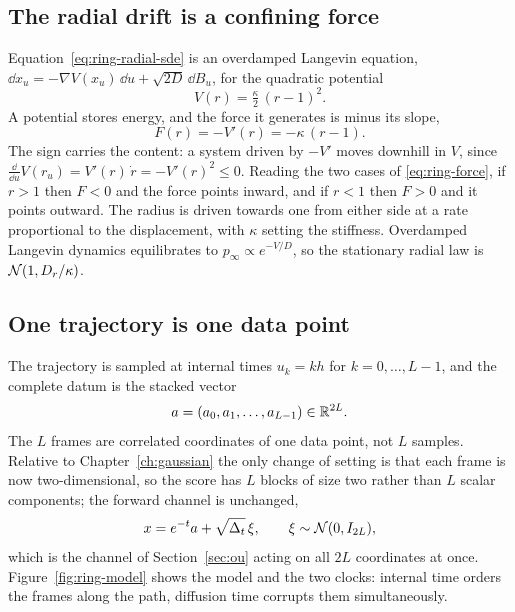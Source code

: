 \subsection{The radial drift is a confining force}

Equation~\eqref{eq:ring-radial-sde} is an overdamped Langevin equation,
$\dd x_u = -\nabla V(x_u)\,\dd u + \sqrt{2D}\,\dd B_u$, for the quadratic
potential
\begin{equation}
  V(r) = \tfrac{\kappa}{2}\,(r-1)^2 .
  \label{eq:ring-potential}
\end{equation}
A potential stores energy, and the force it generates is minus its slope,
\begin{equation}
  F(r) = -V'(r) = -\kappa\,(r-1) .
  \label{eq:ring-force}
\end{equation}
The sign carries the content: a system driven by $-V'$ moves downhill in $V$,
since $\tfrac{\dd}{\dd u} V(r_u) = V'(r)\,\dot r = -V'(r)^2 \le 0$. Reading the
two cases of \eqref{eq:ring-force}, if $r > 1$ then $F < 0$ and the force points
inward, and if $r < 1$ then $F > 0$ and it points outward. The radius is driven
towards one from either side at a rate proportional to the displacement, with
$\kappa$ setting the stiffness. Overdamped Langevin dynamics equilibrates to
$p_\infty \propto e^{-V/D}$, so the stationary radial law is
$\mathcal{N}(1, D_r/\kappa)$.

\subsection{One trajectory is one data point}

The trajectory is sampled at internal times $u_k = k h$ for
$k = 0, \dots, L-1$, and the complete datum is the stacked vector
\begin{equation}
  a = (a_0, a_1, \dots, a_{L-1}) \in \mathbb{R}^{2L} .
  \label{eq:ring-datum}
\end{equation}
The $L$ frames are correlated coordinates of one data point, not $L$ samples.
Relative to Chapter~\ref{ch:gaussian} the only change of setting is that each
frame is now two-dimensional, so the score has $L$ blocks of size two rather
than $L$ scalar components; the forward channel is unchanged,
\begin{equation}
  x = e^{-t} a + \sqrt{\Delta_t}\, \xi , \qquad \xi \sim \mathcal{N}(0, I_{2L}) ,
  \label{eq:ring-channel}
\end{equation}
which is the channel of Section~\ref{sec:ou} acting on all $2L$ coordinates at
once. Figure~\ref{fig:ring-model} shows the model and the two clocks: internal
time orders the frames along the path, diffusion time corrupts them
simultaneously.

